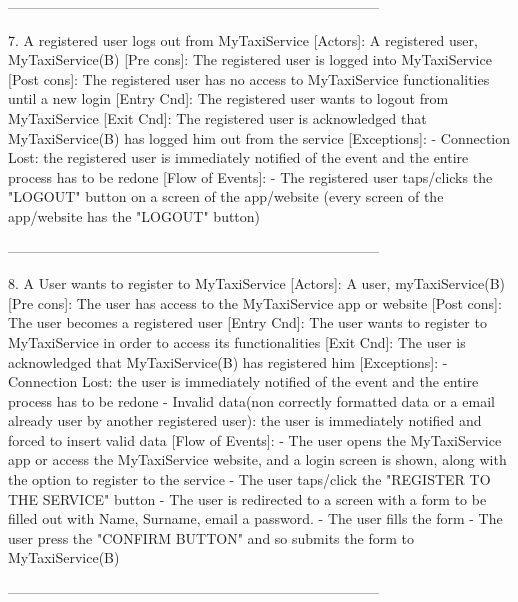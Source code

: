 \documentclass[11pt]{article} %
\begin{document}
      --------------------------------------------------------------------------------

      7. A registered user logs out from MyTaxiService
        [Actors]: A registered user, MyTaxiService(B)
        [Pre cons]: The registered user is logged into MyTaxiService
        [Post cons]: The registered user has no access to MyTaxiService functionalities
        until a new login
        [Entry Cnd]: The registered user wants to logout from MyTaxiService
        [Exit Cnd]: The registered user is acknowledged that MyTaxiService(B) has logged him out from
        the service
        [Exceptions]:
          - Connection Lost: the registered user is immediately notified of the event and the entire process
          has to be redone
        [Flow of Events]:
          - The registered user taps/clicks the "LOGOUT" button on a screen of the app/website
          (every screen of the app/website has the "LOGOUT" button)

      --------------------------------------------------------------------------------

      8. A User wants to register to MyTaxiService
        [Actors]: A user, myTaxiService(B)
        [Pre cons]: The user has access to the MyTaxiService app or website
        [Post cons]: The user becomes a registered user
        [Entry Cnd]: The user wants to register to MyTaxiService in order
        to access its functionalities
        [Exit Cnd]: The user is acknowledged that MyTaxiService(B) has registered him
        [Exceptions]:
          - Connection Lost: the user is immediately notified of the event and the entire process
          has to be redone
          - Invalid data(non correctly formatted data or a email already
          user by another registered user): the user is immediately notified and forced to insert valid data
        [Flow of Events]:
          - The user opens the MyTaxiService app or access the MyTaxiService website, and a login
            screen is shown, along with the option to register to the service
          - The user taps/click the "REGISTER TO THE SERVICE" button
          - The user is redirected to a screen with a form to be filled out with Name, Surname, email a password.
          - The user fills the form
          - The user press the "CONFIRM BUTTON" and so submits the form to MyTaxiService(B)

      --------------------------------------------------------------------------------
\end{document}
